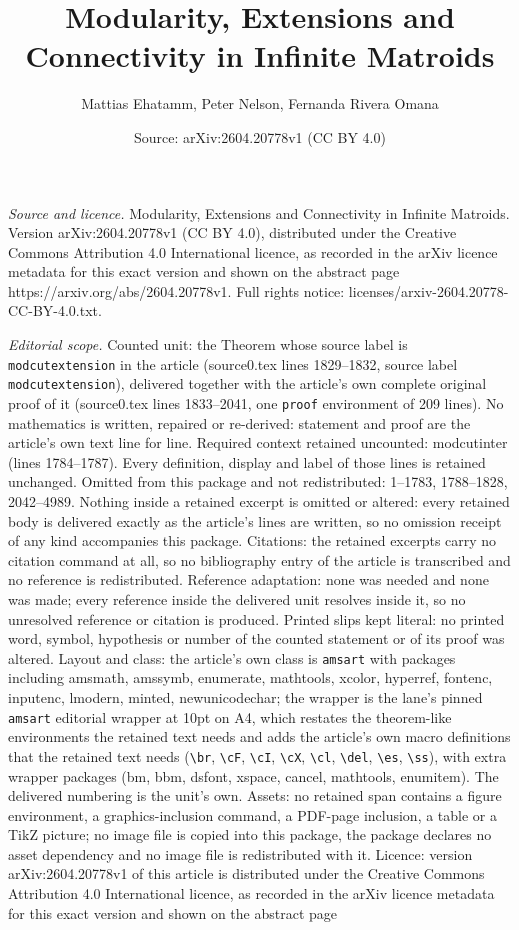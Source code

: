 \documentclass[10pt,a4paper]{amsart}
\title[Modularity, Extensions and Connectivity in Infinite Matroids]{Modularity, Extensions and Connectivity in Infinite Matroids}
\author{Mattias Ehatamm, Peter Nelson, Fernanda Rivera Omana}
\date{Source: arXiv:2604.20778v1 (CC BY 4.0)}
\begin{document}
\maketitle

\noindent\emph{Source and licence.} Modularity, Extensions and Connectivity in Infinite Matroids. Version arXiv:2604.20778v1 (CC BY 4.0), distributed under the Creative Commons Attribution 4.0 International licence, as recorded in the arXiv licence metadata for this exact version and shown on the abstract page https://arxiv.org/abs/2604.20778v1. Full rights notice: licenses/arxiv-2604.20778-CC-BY-4.0.txt.\par\smallskip

\noindent\textit{Editorial scope.} Counted unit: the Theorem whose source label is \texttt{modcutextension} in the article (source0.tex lines 1829--1832, source label \texttt{modcutextension}), delivered together with the article's own complete original proof of it (source0.tex lines 1833--2041, one \texttt{proof} environment of 209 lines). No mathematics is written, repaired or re-derived: statement and proof are the article's own text line for line. Required context retained uncounted: modcutinter (lines 1784--1787). Every definition, display and label of those lines is retained unchanged. Omitted from this package and not redistributed: 1--1783, 1788--1828, 2042--4989. Nothing inside a retained excerpt is omitted or altered: every retained body is delivered exactly as the article's lines are written, so no omission receipt of any kind accompanies this package. Citations: the retained excerpts carry no citation command at all, so no bibliography entry of the article is transcribed and no reference is redistributed. Reference adaptation: none was needed and none was made; every reference inside the delivered unit resolves inside it, so no unresolved reference or citation is produced. Printed slips kept literal: no printed word, symbol, hypothesis or number of the counted statement or of its proof was altered. Layout and class: the article's own class is \texttt{amsart} with packages including amsmath, amssymb, enumerate, mathtools, xcolor, hyperref, fontenc, inputenc, lmodern, minted, newunicodechar; the wrapper is the lane's pinned \texttt{amsart} editorial wrapper at 10pt on A4, which restates the theorem-like environments the retained text needs and adds the article's own macro definitions that the retained text needs (\texttt{\textbackslash br}, \texttt{\textbackslash cF}, \texttt{\textbackslash cI}, \texttt{\textbackslash cX}, \texttt{\textbackslash cl}, \texttt{\textbackslash del}, \texttt{\textbackslash es}, \texttt{\textbackslash ss}), with extra wrapper packages (bm, bbm, dsfont, xspace, cancel, mathtools, enumitem). The delivered numbering is the unit's own. Assets: no retained span contains a figure environment, a graphics-inclusion command, a PDF-page inclusion, a table or a TikZ picture; no image file is copied into this package, the package declares no asset dependency and no image file is redistributed with it. Licence: version arXiv:2604.20778v1 of this article is distributed under the Creative Commons Attribution 4.0 International licence, as recorded in the arXiv licence metadata for this exact version and shown on the abstract page 
\end{document}
